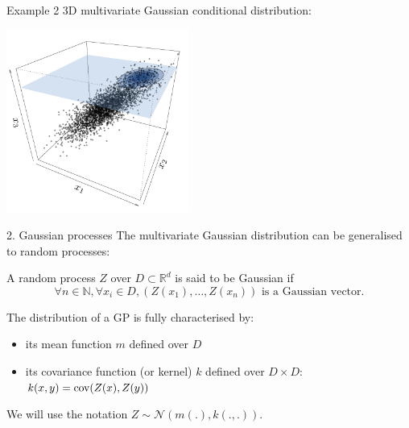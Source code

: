 \begin{frame}{}
\begin{exampleblock}{Example 2}
3D multivariate Gaussian conditional distribution:\\
\begin{center}
\includegraphics[height=6cm]{1_stat_models/figures/ch1_condpdf2}
\end{center}
\end{exampleblock}
\end{frame}



\begin{frame}{2. Gaussian processes}
The multivariate Gaussian distribution can be generalised to random processes:
\begin{definition}
A random process $Z$ over $D \subset \mathds{R}^d$ is said to be Gaussian if
\begin{equation*}
\forall n \in \mathds{N}, \forall x_i \in D, (Z(x_1),\dots,Z(x_n)) \text{  is a Gaussian vector}.
\end{equation*}
\end{definition}
The distribution of a GP is fully characterised by:
\begin{itemize}
	\item its mean function $m$ defined over $D$
	\item its covariance function (or kernel) $k$ defined over $D \times D$: $k(x,y) = \operatorname*{cov}(Z(x),Z(y))$
\end{itemize}
We will use the notation $Z \sim \mathcal{N}(m(.),k(.,.))$.\\
\end{frame}

